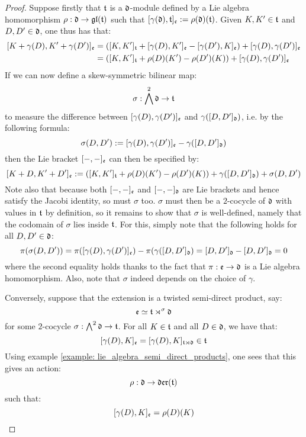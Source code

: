             \begin{proof}
                Suppose firstly that $\mathfrak{t}$ is a $\mathfrak{d}$-module defined by a Lie algebra homomorphism $\rho: \mathfrak{d} \to \mathfrak{gl}(\mathfrak{t})$ such that $[\gamma(\mathfrak{d}), \mathfrak{t}]_{\mathfrak{e}} := \rho(\mathfrak{d})(\mathfrak{t})$. Given $K, K' \in \mathfrak{t}$ and $D, D' \in \mathfrak{d}$, one thus has that:
                    $$
                        \begin{aligned}
                            [ K + \gamma(D), K' + \gamma(D') ]_{\frake} & = ( [K, K']_{\t} + [\gamma(D), K']_{\frake} - [\gamma(D'), K]_{\frake} ) + [\gamma(D), \gamma(D')]_{\frake}
                            \\
                            & = ( [K, K']_{\t} + \rho(D)(K') - \rho(D')(K) ) + [\gamma(D), \gamma(D')]_{\frake}
                        \end{aligned}
                    $$
                If we can now define a skew-symmetric bilinear map:
                    $$\sigma: \bigwedge^2 \mathfrak{d} \to \mathfrak{t}$$
                to measure the difference between $[\gamma(D), \gamma(D')]_{\mathfrak{e}}$ and $\gamma([D, D']_{\mathfrak{d}})$, i.e. by the following formula:
                    $$\sigma(D, D') := [\gamma(D), \gamma(D')]_{\mathfrak{e}} - \gamma( [D, D']_{\mathfrak{d}} )$$
                then the Lie bracket $[-, -]_{\mathfrak{e}}$ can then be specified by:
                    $$[ K + D, K' + D' ]_{\mathfrak{e}} := ( [K, K']_{\mathfrak{t}} + \rho(D)(K') - \rho(D')(K) ) + \gamma( [D, D']_{\mathfrak{d}} ) + \sigma(D, D')$$
                Note also that because both $[-, -]_{\mathfrak{e}}$ and $[-, -]_{\mathfrak{d}}$ are Lie brackets and hence satisfy the Jacobi identity, so must $\sigma$ too. $\sigma$ must then be a $2$-cocycle of $\mathfrak{d}$ with values in $\mathfrak{t}$ by definition, so it remains to show that $\sigma$ is well-defined, namely that the codomain of $\sigma$ lies inside $\mathfrak{t}$. For this, simply note that the following holds for all $D, D' \in \mathfrak{d}$:
                    $$\pi( \sigma(D, D') ) = \pi( [\gamma(D), \gamma(D')]_{\mathfrak{e}} ) - \pi( \gamma( [D, D']_{\mathfrak{d}} ) = [D, D']_{\mathfrak{d}} - [D, D']_{\mathfrak{d}} = 0$$
                where the second equality holds thanks to the fact that $\pi: \mathfrak{e} \to \mathfrak{d}$ is a Lie algebra homomorphism. Also, note that $\sigma$ indeed depends on the choice of $\gamma$.

                Conversely, suppose that the extension is a twisted semi-direct product, say:
                    $$\mathfrak{e} \simeq \mathfrak{t} \rtimes^{\sigma} \mathfrak{d}$$
                for some $2$-cocycle $\sigma: \bigwedge^2 \mathfrak{d} \to \mathfrak{t}$. For all $K \in \mathfrak{t}$ and all $D \in \mathfrak{d}$, we have that:
                    $$[\gamma(D), K]_{\mathfrak{e}} = [\gamma(D), K]_{\mathfrak{t} \rtimes \mathfrak{d}} \in \mathfrak{t}$$
                Using example \ref{example: lie_algebra_semi_direct_products}, one sees that this gives an action:
                    $$\rho: \mathfrak{d} \to \mathfrak{der}(\mathfrak{t})$$
                such that:
                    $$[\gamma(D), K]_{\mathfrak{e}} = \rho(D)(K)$$
            \end{proof}
